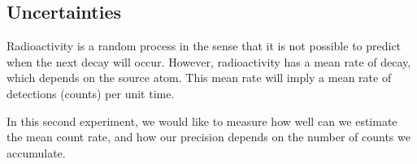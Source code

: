 \subsection{Uncertainties}

Radioactivity is a random process in the sense that it is not possible to predict when the next decay will occur. However, radioactivity has a mean rate of decay, which depends on the source atom. This mean rate will imply a mean rate of detections (counts) per unit time.

In this second experiment, we would like to measure how well can we estimate the mean count rate, and how our precision depends on the number of counts we accumulate.
